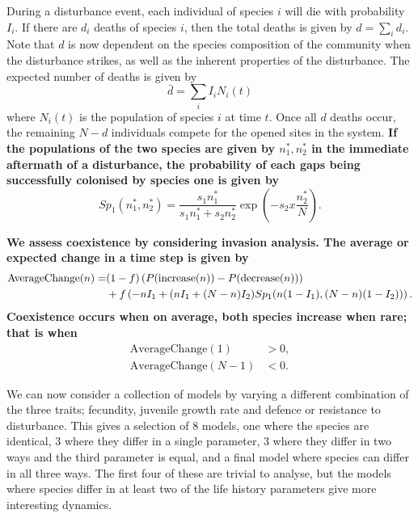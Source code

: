 \documentclass[preprint,10pt,reqno]{amsart}
\begin{document}
During a disturbance event, each individual of species $i$ will die with probability $I_i$. If there are $d_i$ deaths of species $i$, then the total deaths is given by $d=\sum_i d_i$. Note that $d$ is now dependent on the species composition of the community when the disturbance strikes, as well as the inherent properties of the disturbance. The expected number of deaths is given by
\begin{equation}
\label{avdeaths} \bar{d}=\sum_i I_i N_i(t)
\end{equation}
where $N_i(t)$ is the population of species $i$ at time $t$. Once all $d$ deaths occur, the remaining $N-d$ individuals compete for the opened sites in the system. \textbf{If the populations of the two species are given by $n_1^*,n_2^*$ in the immediate aftermath of a disturbance, the probability of each gaps being successfully colonised by species one is given by}
\begin{equation}
\label{sp1}
Sp_1(n_1^*,n_2^*)=\frac{s_1 n_1^*}{s_1n_1^*+s_2n_2^*}\exp \left(-s_2 x\frac{n_2^*}{N}\right).
\end{equation}

\textbf{We assess coexistence by considering invasion analysis. The average or expected change in a time step is given by
\begin{align}
\text{AverageChange}(n)=&(1-f)\left(P(\text{increase}(n))-P(\text{decrease}(n))\right)  \\
&+f\left(-nI_1 +(nI_1+(N-n)I_2)Sp_1(n(1-I_1),(N-n)(1-I_2))\right).\notag
\end{align}
Coexistence occurs when on average, both species increase when rare; that is when}
\begin{align*}
\text{AverageChange}(1)&>0,\\
\text{AverageChange}(N-1)&<0. \end{align*}

We can now consider a collection of models by varying a different combination of the three traits; fecundity, juvenile growth rate and defence or resistance to disturbance. This gives a selection of 8 models, one where the species are identical, 3 where they differ in a single parameter, 3 where they differ in two ways and the third parameter is equal, and a final model where species can differ in all three ways. The first four of these are trivial to analyse, but the models where species differ in at least two of the life history parameters give more interesting dynamics.
\end{document}

